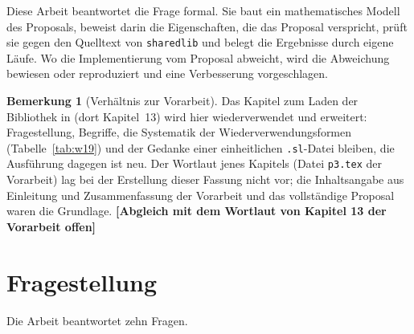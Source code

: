 \documentclass[a4paper,12pt,twoside]{report}
\DeclareRobustCommand{\_}{\ifmmode\mbox{\textunderscore}\else\textunderscore\allowbreak{}\fi}
\theoremstyle{definition}
\newtheorem{bemerkung}{Bemerkung}[chapter]
\newcommand{\offen}[1]{\textcolor{accentred}{\textbf{[#1]}}}
\begin{document}
Diese Arbeit beantwortet die Frage formal. Sie baut ein mathematisches Modell des Proposals, beweist darin die Eigenschaften, die das Proposal verspricht, prüft sie gegen den Quelltext von \texttt{sharedlib} und belegt die Ergebnisse durch eigene Läufe. Wo die Implementierung vom Proposal abweicht, wird die Abweichung bewiesen oder reproduziert und eine Verbesserung vorgeschlagen.

\begin{bemerkung}[Verhältnis zur Vorarbeit]
	Das Kapitel zum Laden der Bibliothek in \cite{epp2026csubgraph} (dort Kapitel~13) wird hier wiederverwendet und erweitert: Fragestellung, Begriffe, die Systematik der Wiederverwendungsformen (Tabelle~\ref{tab:w19}) und der Gedanke einer einheitlichen \texttt{.sl}-Datei bleiben, die Ausführung dagegen ist neu. Der Wortlaut jenes Kapitels (Datei \texttt{p3.tex} der Vorarbeit) lag bei der Erstellung dieser Fassung nicht vor; die Inhaltsangabe aus Einleitung und Zusammenfassung der Vorarbeit und das vollständige Proposal waren die Grundlage. \offen{Abgleich mit dem Wortlaut von Kapitel 13 der Vorarbeit offen}
\end{bemerkung}

\section{Fragestellung}

Die Arbeit beantwortet zehn Fragen.
\end{document}
